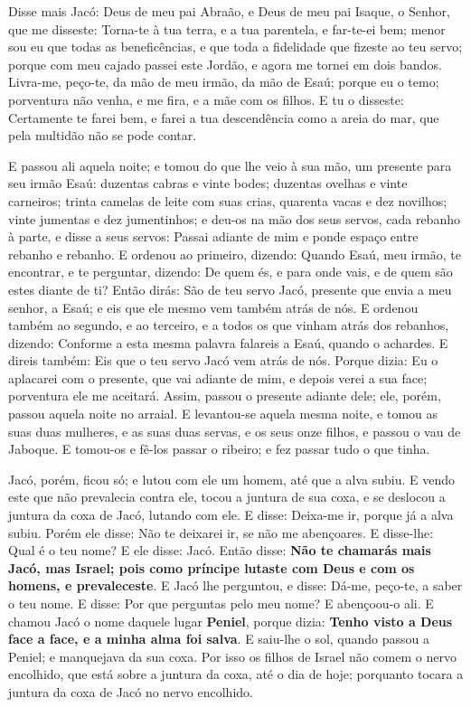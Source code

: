 Disse mais Jacó: Deus de meu pai Abraão, e Deus de meu pai Isaque,
o Senhor, que me disseste: Torna-te à tua terra, e a tua parentela,
e far-te-ei bem; menor sou eu que todas as beneficências, e
que toda a fidelidade que fizeste ao teu servo; porque com meu
cajado passei este Jordão, e agora me tornei em dois bandos.
Livra-me, peço-te, da mão de meu irmão, da mão de Esaú;
porque eu o temo; porventura não venha, e me fira, e a mãe com os
filhos. E tu o disseste: Certamente te farei bem, e farei a
tua descendência como a areia do mar, que pela multidão não se pode
contar.

E passou ali aquela noite; e tomou do que lhe veio à sua mão, um
presente para seu irmão Esaú: duzentas cabras e vinte bodes;
duzentas ovelhas e vinte carneiros; trinta camelas de leite
com suas crias, quarenta vacas e dez novilhos; vinte jumentas e dez
jumentinhos; e deu-os na mão dos seus servos, cada rebanho à
parte, e disse a seus servos: Passai adiante de mim e ponde espaço
entre rebanho e rebanho. E ordenou ao primeiro, dizendo:
Quando Esaú, meu irmão, te encontrar, e te perguntar, dizendo: De
quem és, e para onde vais, e de quem são estes diante de ti?
Então dirás: São de teu servo Jacó, presente que envia a meu
senhor, a Esaú; e eis que ele mesmo vem também atrás de nós.
E ordenou também ao segundo, e ao terceiro, e a todos os que
vinham atrás dos rebanhos, dizendo: Conforme a esta mesma palavra
falareis a Esaú, quando o achardes. E direis também: Eis que
o teu servo Jacó vem atrás de nós. Porque dizia: Eu o aplacarei com
o presente, que vai adiante de mim, e depois verei a sua face;
porventura ele me aceitará. Assim, passou o presente adiante
dele; ele, porém, passou aquela noite no arraial. E
levantou-se aquela mesma noite, e tomou as suas duas mulheres, e as
suas duas servas, e os seus onze filhos, e passou o vau de Jaboque.
E tomou-os e fê-los passar o ribeiro; e fez passar tudo o que
tinha.

Jacó, porém, ficou só; e lutou com ele um homem, até que a alva
subiu. E vendo este que não prevalecia contra ele, tocou a
juntura de sua coxa, e se deslocou a juntura da coxa de Jacó,
lutando com ele. E disse: Deixa-me ir, porque já a alva
subiu. Porém ele disse: Não te deixarei ir, se não me abençoares.
E disse-lhe: Qual é o teu nome? E ele disse: Jacó.
Então disse: \textbf{Não te chamarás mais Jacó, mas Israel;
pois como príncipe lutaste com Deus e com os homens, e
prevaleceste}. E Jacó lhe perguntou, e disse: Dá-me, peço-te,
a saber o teu nome. E disse: Por que perguntas pelo meu nome? E
abençoou-o ali. E chamou Jacó o nome daquele lugar
\textbf{Peniel}, porque dizia: \textbf{Tenho visto a Deus face a
face, e a minha alma foi salva}. E saiu-lhe o sol, quando
passou a Peniel; e manquejava da sua coxa. Por isso os filhos
de Israel não comem o nervo encolhido, que está sobre a juntura da
coxa, até o dia de hoje; porquanto tocara a juntura da coxa de Jacó
no nervo encolhido.

